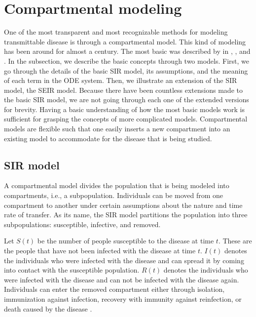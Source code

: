 \section{Compartmental modeling}
\label{sec:literature-review-compartmental-modeling}

One of the most transparent and most recognizable methods for modeling transmittable disease is through a compartmental model.
This kind of modeling has been around for almost a century.
The most basic was described by \citeauthor{kermackContributionMathematicalTheory1927} \cite{kermackContributionMathematicalTheory1927, kermackContributionsMathematicalTheory1932, kermackContributionsMathematicalTheory1933} in \citeyear{kermackContributionMathematicalTheory1927}, \citeyear{kermackContributionsMathematicalTheory1932}, and \citeyear{ kermackContributionsMathematicalTheory1933}.
In the subsection, we describe the basic concepts through two models.
First, we go through the details of the basic \gls{SIR} model, its assumptions, and the meaning of each term in the \gls{ODE} system.
Then, we illustrate an extension of the \gls{SIR} model, the \gls{SEIR} model.
Because there have been countless extensions made to the basic \gls{SIR} model, we are not going through each one of the extended versions for brevity.
Having a basic understanding of how the most basic models work is sufficient for grasping the concepts of more complicated models.
Compartmental models are flexible such that one easily inserts a new compartment into an existing model to accommodate for the disease that is being studied.

\subsection{SIR model}

A compartmental model divides the population that is being modeled into compartments, i.e., a subpopulation.
Individuals can be moved from one compartment to another under certain assumptions about the nature and time rate of transfer.
As its name, the \gls{SIR} model partitions the population into three subpopulations: susceptible, infective, and removed.

Let $S(t)$ be the number of people susceptible to the disease at time $t$.
These are the people that have not been infected with the disease at time $t$.
$I(t)$ denotes the individuals who were infected with the disease and can spread it by coming into contact with the susceptible population.
$R(t)$ denotes the individuals who were infected with the disease and can not be infected with the disease again.
Individuals can enter the removed compartment either through isolation, immunization against infection, recovery with immunity against reinfection, or death caused by the disease \cite{brauerCompartmentalModelsEpidemiology2008}.

